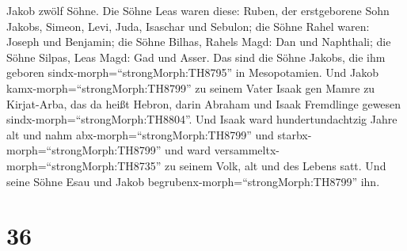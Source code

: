 Jakob zwölf Söhne.  Die Söhne Leas waren diese: Ruben, der
erstgeborene Sohn Jakobs, Simeon, Levi, Juda, Isaschar und Sebulon;
 die Söhne Rahel waren: Joseph und Benjamin; 
die Söhne Bilhas, Rahels Magd: Dan und Naphthali;  die
Söhne Silpas, Leas Magd: Gad und Asser. Das sind die Söhne Jakobs, die
ihm geboren sindx-morph=``strongMorph:TH8795'' in Mesopotamien.
 Und Jakob kamx-morph=``strongMorph:TH8799'' zu seinem
Vater Isaak gen Mamre zu Kirjat-Arba, das da heißt Hebron, darin Abraham
und Isaak Fremdlinge gewesen sindx-morph=``strongMorph:TH8804''.
 Und Isaak ward hundertundachtzig Jahre alt 
und nahm abx-morph=``strongMorph:TH8799'' und
starbx-morph=``strongMorph:TH8799'' und ward
versammeltx-morph=``strongMorph:TH8735'' zu seinem Volk, alt und des
Lebens satt. Und seine Söhne Esau und Jakob
begrubenx-morph=``strongMorph:TH8799'' ihn.

\hypertarget{section-35}{%
\section{36}\label{section-35}}

